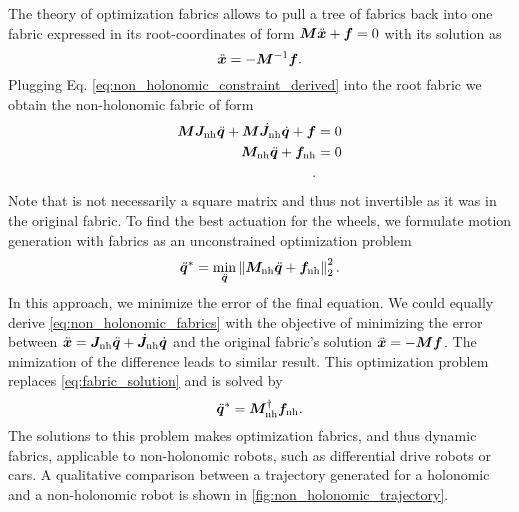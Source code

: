 The theory of optimization fabrics allows to pull a tree of fabrics back into one fabric
expressed in its root-coordinates of form $\bm{M}\ddot{\bm{x}} + \bm{f} = 0$ with its solution as
\begin{equation}
  \ddot{\bm{x}} = -\bm{M}^{-1}\bm{f}.
  \label{eq:fabric_solution}
\end{equation}
Plugging Eq. \ref{eq:non_holonomic_constraint_derived} into the root
fabric we obtain the non-holonomic fabric of form
\begin{align*}
  \bm{M}\bm{J}_{\textrm{nh}}\ddot{\bm{q}} + \bm{M}\dot{\bm{J}}_{\textrm{nh}}\dot{\bm{q}} + \bm{f} & = 0 \\
  \bm{M}_{\textrm{nh}}\ddot{\bm{q}} + \bm{f}_{\textrm{nh}} & = 0 \\.
\end{align*}
Note that \Mnh{} is not necessarily a square matrix and thus not invertible as it was in the
original fabric. To find the best actuation for the wheels, we
formulate motion generation with fabrics as an
unconstrained optimization problem
\begin{equation}
  \ddot{\bm{q}}^{\ast} = \min_{\ddot{\bm{q}}}\left\lVert\bm{M}_{\textrm{nh}}\ddot{\bm{q}} + \bm{f}_{\textrm{nh}}\right\rVert_2^2.
  \label{eq:non_holonomic_fabrics}
\end{equation}
In this approach, we minimize the error of the final equation. We
could equally derive \cref{eq:non_holonomic_fabrics} with the objective
of minimizing the error between $\ddot{\bm{x}} = \bm{J}_{\textrm{nh}}\ddot{\bm{q}}+\dot{\bm{J}}_{\textrm{nh}}\dot{\bm{q}}$ and the
original fabric's solution $\ddot{\bm{x}} = -\bm{M}\bm{f}$. The mimization of the difference
leads to similar result.
This optimization problem replaces \cref{eq:fabric_solution} and is solved by
\begin{equation}
  \ddot{\bm{q}}^{\ast} = \bm{M}_{\textrm{nh}}^{\dagger}\bm{f}_{\textrm{nh}}.
\end{equation}
The solutions to this problem makes optimization fabrics, and thus dynamic fabrics,
applicable to non-holonomic robots, such as differential drive robots or cars.
A qualitative comparison between a trajectory generated for a holonomic
and a non-holonomic robot is shown in \cref{fig:non_holonomic_trajectory}.
